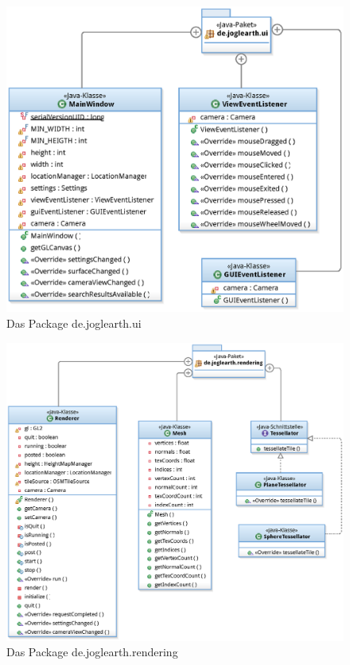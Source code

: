 \documentclass[10pt]{scrreprt}
\begin{document}
\begin{figure}[!htb]
\begin{center}
	\includegraphics[scale=0.55]{de_joglearth_ui.eps}
\end{center}
\caption{Das Package de.joglearth.ui}
\end{figure}

\begin{figure}[!htb]
\begin{center}
	\includegraphics[scale=0.55]{de_joglearth_rendering.eps}
\end{center}
\caption{Das Package de.joglearth.rendering}
\end{figure}
\end{document}
